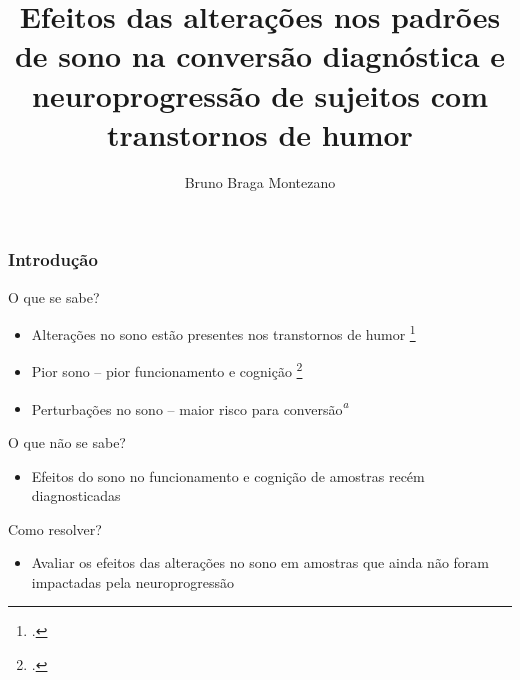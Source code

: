 \documentclass{beamer}
\title{Efeitos das alterações nos padrões de sono na conversão diagnóstica e
       neuroprogressão de sujeitos com transtornos de humor}
\author[Bruno Montezano]{Bruno Braga Montezano}
\institute{Universidade Católica de Pelotas}
\begin{document}
\begin{frame}

\maketitle

\end{frame}

\begin{frame}
\frametitle{Introdução}

    \begin{block}{O que se sabe?}

        \begin{itemize}

            \item Alterações no sono estão presentes nos transtornos de humor
            \footcite{ritter_disturbed_2015}
            \item Pior sono -- pior funcionamento e cognição
            \footcite{lai_familiality_2014,
            kaplan_sleep_2020,
            slyepchenko_association_2019,
            kanady_association_2017}
            \item Perturbações no sono -- maior risco para
            conversão\textit{\textsuperscript{a}}
        
        \end{itemize}

    \end{block}

    \begin{block}{O que não se sabe?}

        \begin{itemize}

            \item Efeitos do sono no funcionamento e cognição de amostras recém
            diagnosticadas

        \end{itemize}

    \end{block}

    \begin{block}{Como resolver?}

        \begin{itemize}

            \item Avaliar os efeitos das alterações no sono em
            amostras que ainda não foram impactadas pela neuroprogressão

        \end{itemize}

    \end{block}


\end{frame}
\end{document}
